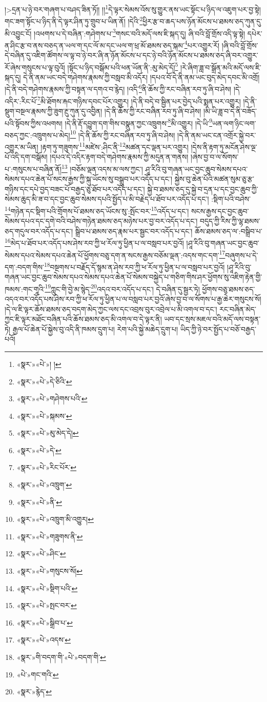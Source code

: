 །>དྲན་པ་ཉེ་བར་གཞག་པ་བཤད་ཟིན་ཏོ།། །།\footnote{«སྣར་»«པེ་»། །}དེ་ལྟར་སེམས་འོས་སུ་གྱུར་ནས་ཡང་སྟོང་པ་ཉིད་ལ་འཇུག་པར་བྱ་སྟེ། གང་ཟག་སྟོང་པ་ཉིད་ནི་དེ་ལྟར་ཤིན་ཏུ་གྲུབ་པ་ཡིན་ནོ། །དེའི་\footnote{«སྣར་»«པེ་»དེ་ཅིའི་}ཕྱིར་རྩ་བ་ཆད་པས་ཉོན་མོངས་པ་ཐམས་ཅད་ཀུན་དུ་མི་འབྱུང་ངོ། །འཕགས་པ་དེ་བཞིན་:གཤེགས་པ་\footnote{«སྣར་»«པེ་»གཤེགས་པའི་}གསང་བའི་མདོ་ལས་ཇི་སྐད་དུ། ཞི་བའི་བློ་གྲོས་འདི་ལྟ་སྟེ། དཔེར་ན་ཤིང་རྩ་བ་ནས་བཅད་ན་ཡལ་ག་དང་ལོ་མ་དང་ཡལ་ག་ཕྲ་མོ་ཐམས་ཅད་སྐམ་\footnote{«སྣར་»«པེ་»སྐམས་}པར་འགྱུར་རོ། །ཞི་བའི་བློ་གྲོས་དེ་བཞིན་དུ་འཇིག་ཚོགས་ལ་ལྟ་བ་ཉེ་བར་ཞི་ན་ཉོན་མོངས་པ་དང་ཉེ་བའི་ཉོན་མོངས་པ་ཐམས་ཅད་ཞི་བར་འགྱུར་རོ་ཞེས་གསུངས་པ་ལྟ་བུའོ། །སྟོང་པ་ཉིད་བསྒོམ་པའི་ཕན་ཡོན་ནི་:མུ་མེད་དོ།\footnote{«སྣར་»«པེ་»མུ་མེད་དེ།} །རེ་ཞིག་ཟླ་བ་སྒྲོན་མའི་མདོ་ལས་ཇི་སྐད་དུ། དེ་ནི་ནམ་ཡང་བདེ་གཤེགས་རྣམས་ཀྱི་བསླབ་མི་འདོར། །དཔའ་བོ་དེ་ནི་ནམ་ཡང་བུད་མེད་དབང་མི་འགྲོ། །དེ་ནི་བདེ་གཤེགས་རྣམས་ཀྱི་བསྟན་ལ་དགའ་བ་རྙེད། །འདི་\footnote{«སྣར་»«པེ་»དེ་}ནི་ཆོས་ཀྱི་རང་བཞིན་རབ་ཏུ་ཞི་བ་ཤེས། །དེ་འདིར་:རིང་པོ་\footnote{«སྣར་»«པེ་»རིང་པོར་}མི་ཐོགས་རྐང་གཉིས་དབང་པོར་འགྱུར། །དེ་ནི་བདེ་བ་སྦྱིན་པར་བྱེད་པའི་སྨན་པར་འགྱུར། །དེ་ནི་སྡུག་བསྔལ་རྣམས་ཀྱི་ཟུག་རྔུ་ཀུན་དུ་འབྱིན། །དེ་ནི་ཆོས་ཀྱི་རང་བཞིན་རབ་ཏུ་ཞི་བ་ཤེས། །མི་ཡི་ཟླ་བ་དེ་ནི་བཟོད་པའི་སྟོབས་ཀྱིས་འཕགས། །དེ་ནི་རྡོ་དབྱུག་དག་གིས་བསྣུན་ཀྱང་འཁྲུགས་\footnote{«སྣར་»«པེ་»འཁྲུག་}མི་འགྱུར། །དེ་ཡི་\footnote{«སྣར་»«པེ་»ནི་}ཡན་ལག་ཉིང་ལག་བཅད་ཀྱང་:འཁྲུགས་པ་མེད།\footnote{«སྣར་»«པེ་»འཁྲུག་མི་འགྱུར།} །དེ་ནི་ཆོས་ཀྱི་རང་བཞིན་རབ་ཏུ་ཞི་བ་ཤེས། །དེ་ནི་ནམ་ཡང་ངན་འགྲོར་སྐྱེ་བར་འགྱུར་མ་ཡིན། །རྟག་ཏུ་གཟུགས་\footnote{«སྣར་»«པེ་»གཟུགས་ནི་}མཛེས་:ཤིང་ནི་\footnote{«སྣར་»«པེ་»ཤིང་}མཚན་དང་ལྡན་པར་འགྱུར། །དེས་ནི་རྟག་ཏུ་མངོན་ཤེས་ལྔ་པོ་འདི་དག་བསྒོམ། །དཔའ་དེ་འདིར་རྟག་བདེ་གཤེགས་རྣམས་ཀྱི་མདུན་ན་གནས། །ཞེས་བྱ་བ་ལ་སོགས་པ་:གསུངས་པ་བཞིན་ནོ།\footnote{«སྣར་»«པེ་»གསུངས་སོ།} །བཅོམ་ལྡན་འདས་མ་ལས་ཀྱང་། ཤཱ་རིའི་བུ་གཞན་ཡང་བྱང་ཆུབ་སེམས་དཔའ་སེམས་དཔའ་ཆེན་པོ་སངས་རྒྱས་ཀྱི་སྐུ་ཡོངས་སུ་བསྒྲུབ་པར་འདོད་པ་དང་། སྐྱེས་བུ་ཆེན་པོའི་མཚན་སུམ་ཅུ་རྩ་གཉིས་དང་དཔེ་བྱད་བཟང་པོ་བརྒྱད་ཅུ་ཐོབ་པར་འདོད་པ་དང་། སྐྱེ་བ་ཐམས་ཅད་དུ་སྐྱེ་བ་དྲན་པ་དང་བྱང་ཆུབ་ཀྱི་སེམས་ཆུད་མི་ཟ་བ་དང་བྱང་ཆུབ་སེམས་དཔའི་སྤྱོད་པ་མི་བརྗེད་པ་ཐོབ་པར་འདོད་པ་དང་། :སྡིག་པའི་བཤེས་\footnote{«སྣར་»«པེ་»སྡིག་པའི་}གཉེན་དང་སྡིག་པའི་གྲོགས་པོ་ཐམས་ཅད་ཡོངས་སུ་:སྤོང་བར་\footnote{«སྣར་»«པེ་»སྤང་བར་}འདོད་པ་དང་། སངས་རྒྱས་དང་བྱང་ཆུབ་སེམས་དཔའ་དང་དགེ་བའི་བཤེས་གཉེན་ཐམས་ཅད་མཉེས་པར་བྱ་བར་འདོད་པ་དང་། བདུད་ཀྱི་རིས་ཀྱི་ལྷ་ཐམས་ཅད་གདུལ་བར་འདོད་པ་དང་། སྒྲིབ་པ་ཐམས་ཅད་རྣམ་པར་སྦྱང་བར་འདོད་པ་དང་། ཆོས་ཐམས་ཅད་ལ་:བསྒྲིབ་པ་\footnote{«སྣར་»«པེ་»སྒྲིབ་པ་}མེད་པ་ཐོབ་པར་འདོད་པས་ཤེས་རབ་ཀྱི་ཕ་རོལ་ཏུ་ཕྱིན་པ་ལ་བསླབ་པར་བྱའོ། །ཤཱ་རིའི་བུ་གཞན་ཡང་བྱང་ཆུབ་སེམས་དཔའ་སེམས་དཔའ་ཆེན་པོ་ཕྱོགས་བཅུ་དག་ན་སངས་རྒྱས་བཅོམ་ལྡན་:འདས་གང་དག་\footnote{«སྣར་»«པེ་»འདས་}བཞུགས་པ་དེ་དག་:བདག་གིས་\footnote{«སྣར་»གི་བདག་གི་«པེ་»བདག་གི་}བསྔགས་པ་བརྗོད་དོ་སྙམ་ན་ཤེས་རབ་ཀྱི་ཕ་རོལ་ཏུ་ཕྱིན་པ་ལ་བསླབ་པར་བྱའོ། །ཤཱ་རིའི་བུ་གཞན་ཡང་བྱང་ཆུབ་སེམས་དཔའ་སེམས་དཔའ་ཆེན་པོ་སེམས་བསྐྱེད་པ་གཅིག་གིས་ཤར་ཕྱོགས་སུ་འཇིག་རྟེན་གྱི་ཁམས་:གང་གཱའི་\footnote{«པེ་»གང་གའི་}ཀླུང་གི་བྱེ་མ་སྙེད་\footnote{«སྣར་»རྙེད་}འདའ་བར་འདོད་པ་དང་། དེ་བཞིན་དུ་སྦྱར་ཏེ། ཕྱོགས་བཅུ་ཐམས་ཅད་འདའ་བར་འདོད་པས་ཤེས་རབ་ཀྱི་ཕ་རོལ་ཏུ་ཕྱིན་པ་ལ་བསླབ་པར་བྱའོ་ཞེས་བྱ་བ་ལ་སོགས་པ་རྒྱ་ཆེར་གསུངས་སོ། །དེ་ལ་ཇི་ལྟར་ཆོས་ཐམས་ཅད་བདག་མེད་ཀྱང་ལས་དང་འབྲས་བུར་འབྲེལ་པ་མི་འགལ་བ་དང་། རང་བཞིན་མེད་ཀྱང་ཇི་ལྟར་མཐོང་བཞིན་པའི་ཆོས་ཐམས་ཅད་མི་འགལ་བ་དེ་ལྟར་ནི། ཡབ་དང་སྲས་མཇལ་བའི་མདོ་ལས་བསྟན་ཏེ། རྒྱལ་པོ་ཆེན་པོ་སྐྱེས་བུ་འདི་ནི་ཁམས་དྲུག་པ། རེག་པའི་སྐྱེ་མཆེད་དྲུག་པ། ཡིད་ཀྱི་ཉེ་བར་སྤྱོད་པ་བཅོ་བརྒྱད་པའོ། 